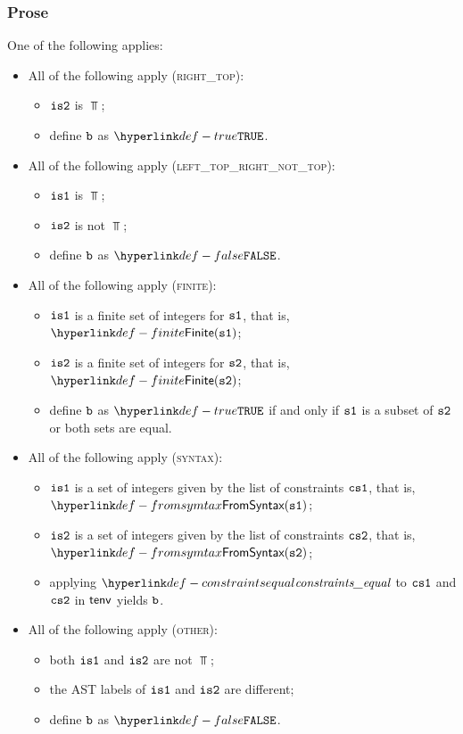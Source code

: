 \subsubsection{Prose}
One of the following applies:
\begin{itemize}
  \item All of the following apply (\textsc{right\_top}):
  \begin{itemize}
    \item $\texttt{is2}$ is $\Top$;
    \item define $\texttt{b}$ as $\True$.
  \end{itemize}

  \item All of the following apply (\textsc{left\_top\_right\_not\_top}):
  \begin{itemize}
    \item $\texttt{is1}$ is $\Top$;
    \item $\texttt{is2}$ is not $\Top$;
    \item define $\texttt{b}$ as $\False$.
  \end{itemize}

  \item All of the following apply (\textsc{finite}):
  \begin{itemize}
    \item $\texttt{is1}$ is a finite set of integers for $\texttt{s1}$, that is, $\Finite(\vsone)$;
    \item $\texttt{is2}$ is a finite set of integers for $\texttt{s2}$, that is, $\Finite(\vstwo)$;
    \item define $\texttt{b}$ as $\True$ if and only if $\texttt{s1}$ is a subset of $\texttt{s2}$ or both sets are equal.
  \end{itemize}

  \item All of the following apply (\textsc{syntax}):
  \begin{itemize}
    \item $\texttt{is1}$ is a set of integers given by the list of constraints $\texttt{cs1}$, that is, \\ $\FromSyntax(\vsone)$;
    \item $\texttt{is2}$ is a set of integers given by the list of constraints $\texttt{cs2}$, that is, \\ $\FromSyntax(\vstwo)$;
    \item applying $\constraintsequal$ to $\texttt{cs1}$ and $\texttt{cs2}$ in $\textsf{tenv}$ yields $\texttt{b}$.
  \end{itemize}

  \item All of the following apply (\textsc{other}):
  \begin{itemize}
    \item both $\texttt{is1}$ and $\texttt{is2}$ are not $\Top$;
    \item the AST labels of $\texttt{is1}$ and $\texttt{is2}$ are different;
    \item define $\texttt{b}$ as $\False$.
  \end{itemize}
\end{itemize}

